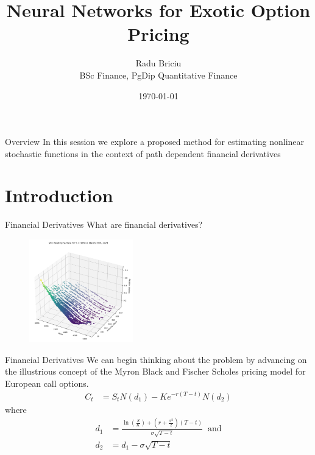 \documentclass[aspectratio=169,xcolor=dvipsnames]{beamer}
\title{\huge \textbf{Neural Networks for Exotic Option Pricing}}
\author{\small Radu Briciu \\ \tiny BSc Finance, PgDip Quantitative Finance}
\institute
{
	
}
\date{\today} %
\begin{document}
		\begin{frame}
			\titlepage
		\end{frame}
		
		\begin{frame}{Overview}
			In this session we explore a proposed method for estimating nonlinear stochastic functions in the context of path dependent financial derivatives
			\tableofcontents
		\end{frame}
	
	\section{Introduction}
	
		\begin{frame}{Financial Derivatives}
			What are financial derivatives?
			\begin{figure}[h]
				\centering
				\includegraphics[width=0.4\textwidth]{../manuscript/images/surface.png}
			\end{figure}
		\end{frame}
		
		
		\begin{frame}{Financial Derivatives}
			We can begin thinking about the problem by advancing on the illustrious concept of the Myron Black and Fischer Scholes pricing model for European call options.
			\begin{align}
				C_{t} &= S_{t} N(d_{1}) - K e^{-r(T-t)} N(d_{2})
			\end{align} where
			\begin{align}
				d_{1} &= \frac{\ln(\frac{S}{K}) + (r+\frac{\sigma^{2}}{2})(T-t)}{\sigma\sqrt{T-t}} \; \; \text{and} \\
				d_{2} &= d_{1} - \sigma \sqrt{T-t}
			\end{align}
		\end{frame}
		
\end{document}

